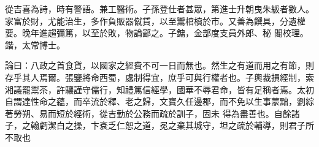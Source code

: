 \begin{pinyinscope}
 從吉喜為詩，時有警語。兼工醫術。子孫登仕者甚眾，第進士升朝曳朱紱者數人。家富於財，尤能治生，多作負販器僦賃，以至鬻棺櫝於市。又善為饌具，分遺權要。晚年進趨彌篤，以至於敗，物論鄙之。子鏞，金部度支員外郎、秘
 閣校理。鍇，太常博士。



 論曰：八政之首食貨，以國家之經費不可一日而無也。然生之有道而用之有節，則存乎其人焉爾。張鑒將命西蜀，處制得宜，庶乎可與行權者也。子輿裁損經制，索湘議罷鬻茶，許驤謹守儒行，知禮篤信經學，國華不辱君命，皆有足稱者焉。太初自謂達性命之蘊，而卒流於釋、老之歸，文寶久任邊郡，而不免以生事蒙黜，劉綜著勞朔、易而短於經術，從吉勤於公務而疏於訓子，固未
 得為盡善也。自餘諸子，之翰虧潔白之操，卞袞乏仁恕之道，冕之棄其城守，坦之疏於輔導，則君子所不取也



\end{pinyinscope}
